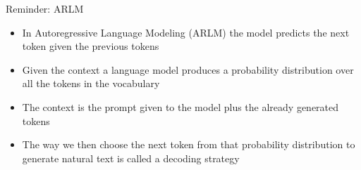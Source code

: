 \documentclass[11pt,compress,t,notes=noshow, xcolor=table]{beamer}
\begin{document}


\begin{frame}{Reminder: ARLM}

\vfill

\begin{itemize}
    \item In Autoregressive Language Modeling (ARLM) the model predicts the next token given the previous tokens
    \item Given the context a language model produces a probability distribution over all the tokens in the vocabulary
    \item The context is the prompt given to the model plus the already generated tokens
    \item The way we then choose the next token from that probability distribution to generate natural text is called a decoding strategy
\end{itemize}

\vfill
    
\end{frame}

\end{document}
